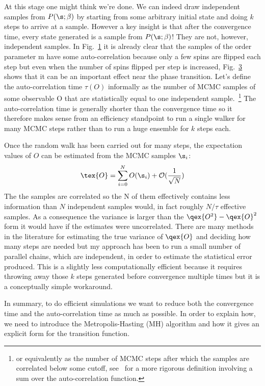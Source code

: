 At this stage one might think we're done. We can indeed draw independent samples from \(P(\s; \beta)\) by starting from some arbitrary initial state and doing \(k\) steps to arrive at a sample. However a key insight is that after the convergence time, every state generated is a sample from \(P(\s; \beta)\)! They are not, however, independent samples. In Fig.~\protect\hyperlink{fig:raw}{1} it is already clear that the samples of the order parameter m have some auto-correlation because only a few spins are flipped each step but even when the number of spins flipped per step is increased, Fig.~\protect\hyperlink{fig:m_autocorr}{3} shows that it can be an important effect near the phase transition. Let's define the auto-correlation time \(\tau(O)\) informally as the number of MCMC samples of some observable O that are statistically equal to one independent sample.~\footnote{or equivalently as the number of MCMC steps after which the samples are correlated below some cutoff, see~\autocite{krauthIntroductionMonteCarlo1996} for a more rigorous definition involving a sum over the auto-correlation function.} The auto-correlation time is generally shorter than the convergence time so it therefore makes sense from an efficiency standpoint to run a single walker for many MCMC steps rather than to run a huge ensemble for \(k\) steps each.

Once the random walk has been carried out for many steps, the expectation values of \(O\) can be estimated from the MCMC samples \(\s_i\): \[\tex{O} = \sum_{i = 0}^{N} O(\s_i) + \mathcal{O}(\frac{1}{\sqrt{N}})\] The the samples are correlated so the N of them effectively contains less information than \(N\) independent samples would, in fact roughly \(N/\tau\) effective samples. As a consequence the variance is larger than the \(\qex{O^2} - \qex{O}^2\) form it would have if the estimates were uncorrelated. There are many methods in the literature for estimating the true variance of \(\qex{O}\) and deciding how many steps are needed but my approach has been to run a small number of parallel chains, which are independent, in order to estimate the statistical error produced. This is a slightly less computationally efficient because it requires throwing away those \(k\) steps generated before convergence multiple times but it is a conceptually simple workaround.

In summary, to do efficient simulations we want to reduce both the convergence time and the auto-correlation time as much as possible. In order to explain how, we need to introduce the Metropolis-Hasting (MH) algorithm and how it gives an explicit form for the transition function.

